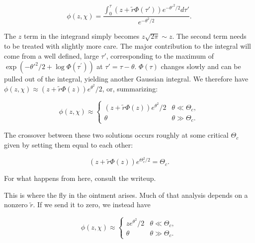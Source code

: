 \documentclass[10pt]{revtex4}
\begin{document}
\begin{equation}
\phi(z,\chi) = \frac{\int_0^\tau (z+\tilde{r}\Phi(\tau\prime)) e^{-\theta\prime^2/2} d\tau\prime}{e^{-\theta^2/2}}.
\end{equation}

The $z$ term in the integrand simply becomes $z\sqrt{2\pi} \sim z$.
The second term needs to be treated with slightly more care.
The major contribution to the integral will come from a well defined, large $\tau\prime$, corresponding to the maximum of $\exp(-\theta\prime^2/2 + \log \Phi(\tau^\prime))$ at $\tau\prime = \tau - \theta$.
$\Phi(\tau)$ changes slowly and can be pulled out of the integral, yielding another Gaussian integral.
We therefore have $\phi(z,\chi) \approx (z+\tilde{r}\Phi(z))e^{\theta^2}/2$, or, summarizing:

\begin{equation}
\phi(z,\chi) \approx
\begin{cases}
(z+\tilde{r}\Phi(z))e^{\theta^2}/2 & \theta \ll \Theta_c, \\
\theta & \theta \gg \Theta_c.
\end{cases}
\end{equation}

The crossover between these two solutions occurs roughly at some critical $\Theta_c$ given by setting them equal to each other: 

\begin{equation}
(z+\tilde{r}\Phi(z))e^{\Theta_c^2/2} = \Theta_c.
\end{equation}

For what happens from here, consult the writeup.

This is where the fly in the ointment arises. Much of that analysis depends on a nonzero $\tilde{r}$.
If we send it to zero, we instead have

\begin{equation}
\phi(z,\chi) \approx
\begin{cases}
ze^{\theta^2}/2 & \theta \ll \Theta_c, \\
\theta & \theta \gg \Theta_c.
\end{cases}
\end{equation}
\end{document}
